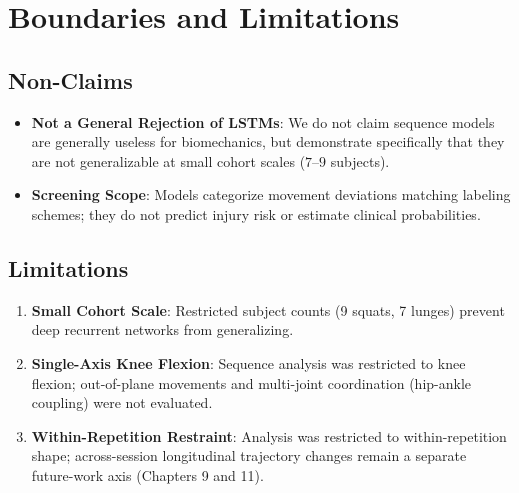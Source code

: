 \section{Boundaries and Limitations}
\label{sec:13-6-boundaries-and-limitations}


\subsection{Non-Claims}
\label{sec:13-6-1-non-claims}

\begin{itemize}
  \item \textbf{Not a General Rejection of LSTMs}: We do not claim sequence models are generally useless for biomechanics, but demonstrate specifically that they are not generalizable at small cohort scales ($7\text{--}9$ subjects).
  \item \textbf{Screening Scope}: Models categorize movement deviations matching labeling schemes; they do not predict injury risk or estimate clinical probabilities.
\end{itemize}

\subsection{Limitations}
\label{sec:13-6-2-limitations}

\begin{enumerate}
  \item \textbf{Small Cohort Scale}: Restricted subject counts (9 squats, 7 lunges) prevent deep recurrent networks from generalizing.
  \item \textbf{Single-Axis Knee Flexion}: Sequence analysis was restricted to knee flexion; out-of-plane movements and multi-joint coordination (hip-ankle coupling) were not evaluated.
  \item \textbf{Within-Repetition Restraint}: Analysis was restricted to within-repetition shape; across-session longitudinal trajectory changes remain a separate future-work axis (Chapters 9 and 11).
\end{enumerate}